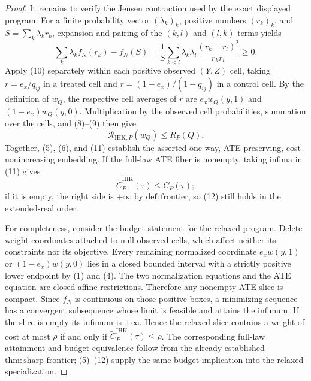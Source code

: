 \documentclass{article}
\begin{document}
\begin{proof}
It remains to verify the Jensen contraction used by the exact displayed program.  For a finite probability vector \((\lambda_k)_k\), positive numbers \((r_k)_k\), and \(S=\sum_k\lambda_kr_k\), expansion and pairing of the \((k,l)\) and \((l,k)\) terms yields
\[
\sum_k\lambda_k f_N(r_k)-f_N(S)
=\frac{1}{S}\sum_{k<l}\lambda_k\lambda_l
\frac{(r_k-r_l)^2}{r_kr_l}\geq0.
\tag{10}
\]
Apply (10) separately within each positive observed \((Y,Z)\) cell, taking \(r=e_x/q_{ij}\) in a treated cell and \(r=(1-e_x)/(1-q_{ij})\) in a control cell.  By the definition of \(w_Q\), the respective cell averages of \(r\) are \(e_xw_Q(y,1)\) and \((1-e_x)w_Q(y,0)\).  Multiplication by the observed cell probabilities, summation over the cells, and (8)--(9) then give
\[
\mathscr R_{\mathrm{IHK},P}(w_Q)\leq R_P(Q).
\tag{11}
\]
Together, (5), (6), and (11) establish the asserted one-way, ATE-preserving, cost-nonincreasing embedding.  If the full-law ATE fiber is nonempty, taking infima in (11) gives
\[
\widetilde C^{\mathrm{IHK}}_P(\tau)\leq C_P(\tau);
\tag{12}
\]
if it is empty, the right side is \(+\infty\) by \(\mathrm{def{:}frontier}\), so (12) still holds in the extended-real order.

For completeness, consider the budget statement for the relaxed program.  Delete weight coordinates attached to null observed cells, which affect neither its constraints nor its objective.  Every remaining normalized coordinate \(e_xw(y,1)\) or \((1-e_x)w(y,0)\) lies in a closed bounded interval with a strictly positive lower endpoint by (1) and (4).  The two normalization equations and the ATE equation are closed affine restrictions.  Therefore any nonempty ATE slice is compact.  Since \(f_N\) is continuous on those positive boxes, a minimizing sequence has a convergent subsequence whose limit is feasible and attains the infimum.  If the slice is empty its infimum is \(+\infty\).  Hence the relaxed slice contains a weight of cost at most \(\rho\) if and only if \(\widetilde C^{\mathrm{IHK}}_P(\tau)\leq\rho\).  The corresponding full-law attainment and budget equivalence follow from the already established \(\mathrm{thm{:}sharp\mbox{-}frontier}\); (5)--(12) supply the same-budget implication into the relaxed specialization.


\end{proof}
\end{document}
